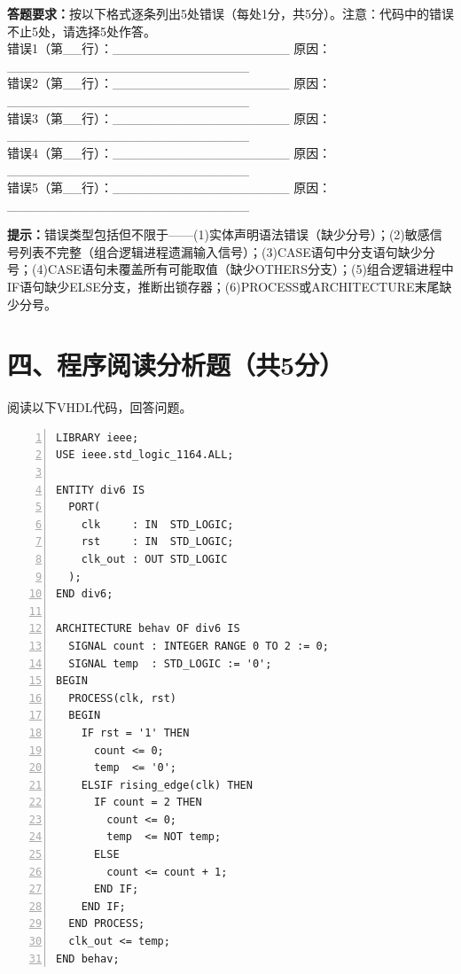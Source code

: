 \begin{framed}
\textbf{答题要求：}按以下格式逐条列出5处错误（每处1分，共5分）。注意：代码中的错误不止5处，请选择5处作答。\\[4pt]
错误1（第\_\_行）：\_\_\_\_\_\_\_\_\_\_\_\_\_\_\_\_\_\_\_ 原因：\_\_\_\_\_\_\_\_\_\_\_\_\_\_\_\_\_\_\_\_\_\_\_\_\_\_\\[2pt]
错误2（第\_\_行）：\_\_\_\_\_\_\_\_\_\_\_\_\_\_\_\_\_\_\_ 原因：\_\_\_\_\_\_\_\_\_\_\_\_\_\_\_\_\_\_\_\_\_\_\_\_\_\_\\[2pt]
错误3（第\_\_行）：\_\_\_\_\_\_\_\_\_\_\_\_\_\_\_\_\_\_\_ 原因：\_\_\_\_\_\_\_\_\_\_\_\_\_\_\_\_\_\_\_\_\_\_\_\_\_\_\\[2pt]
错误4（第\_\_行）：\_\_\_\_\_\_\_\_\_\_\_\_\_\_\_\_\_\_\_ 原因：\_\_\_\_\_\_\_\_\_\_\_\_\_\_\_\_\_\_\_\_\_\_\_\_\_\_\\[2pt]
错误5（第\_\_行）：\_\_\_\_\_\_\_\_\_\_\_\_\_\_\_\_\_\_\_ 原因：\_\_\_\_\_\_\_\_\_\_\_\_\_\_\_\_\_\_\_\_\_\_\_\_\_\_

\vspace{0.5cm}
\textbf{提示：}错误类型包括但不限于——(1)实体声明语法错误（缺少分号）；(2)敏感信号列表不完整（组合逻辑进程遗漏输入信号）；(3)CASE语句中分支语句缺少分号；(4)CASE语句未覆盖所有可能取值（缺少OTHERS分支）；(5)组合逻辑进程中IF语句缺少ELSE分支，推断出锁存器；(6)PROCESS或ARCHITECTURE末尾缺少分号。
\end{framed}

\newpage

\section*{四、程序阅读分析题（共5分）}

阅读以下VHDL代码，回答问题。

\begin{lstlisting}[language=VDL, numbers=left, caption={分析用VHDL代码——6分频器}]
LIBRARY ieee;
USE ieee.std_logic_1164.ALL;

ENTITY div6 IS
  PORT(
    clk     : IN  STD_LOGIC;
    rst     : IN  STD_LOGIC;
    clk_out : OUT STD_LOGIC
  );
END div6;

ARCHITECTURE behav OF div6 IS
  SIGNAL count : INTEGER RANGE 0 TO 2 := 0;
  SIGNAL temp  : STD_LOGIC := '0';
BEGIN
  PROCESS(clk, rst)
  BEGIN
    IF rst = '1' THEN
      count <= 0;
      temp  <= '0';
    ELSIF rising_edge(clk) THEN
      IF count = 2 THEN
        count <= 0;
        temp  <= NOT temp;
      ELSE
        count <= count + 1;
      END IF;
    END IF;
  END PROCESS;
  clk_out <= temp;
END behav;
\end{lstlisting}

